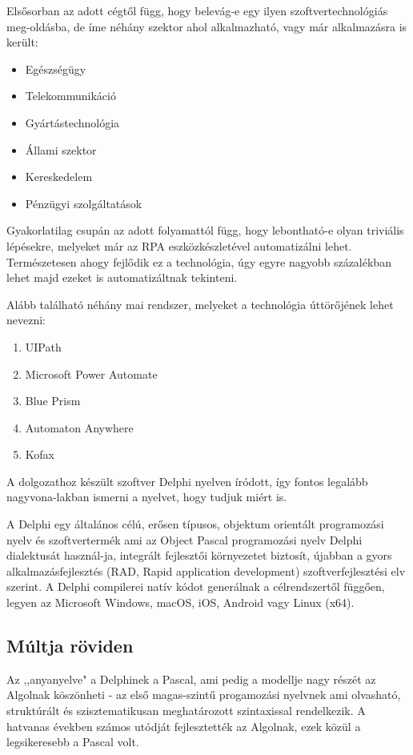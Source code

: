 Elsősorban az adott cégtől függ, hogy belevág-e egy ilyen szoftvertechnológiás meg\hyp{}oldásba, de íme néhány szektor ahol alkalmazható, vagy már alkalmazásra is került:
\begin{itemize}
	\item Egészségügy
	\item Telekommunikáció
	\item Gyártástechnológia
	\item Állami szektor
	\item Kereskedelem
	\item Pénzügyi szolgáltatások
\end{itemize}

Gyakorlatilag csupán az adott folyamattól függ, hogy lebontható-e olyan triviális lépésekre, melyeket már az RPA eszközkészletével automatizálni lehet. Természetesen ahogy fejlődik ez a technológia, úgy egyre nagyobb százalékban lehet majd ezeket is automatizáltnak tekinteni.

Alább található néhány mai rendszer, melyeket a technológia úttörőjének lehet nevezni:
\begin{enumerate}
	\item UIPath
	\item Microsoft Power Automate
	\item Blue Prism
	\item Automaton Anywhere
	\item Kofax
\end{enumerate}


A dolgozathoz készült szoftver Delphi nyelven íródott, így fontos legalább nagyvona\hyp{}lakban ismerni a nyelvet, hogy tudjuk miért is.

A Delphi egy általános célú, erősen típusos, objektum orientált programozási nyelv és szoftvertermék ami az Object Pascal programozási nyelv Delphi dialektusát használ\hyp{}ja, integrált fejlesztői környezetet biztosít, újabban a gyors alkalmazásfejlesztés (RAD, Rapid application development) szoftverfejlesztési elv szerint. A Delphi compilerei natív kódot generálnak a célrendszertől függően, legyen az Microsoft Windows, macOS, iOS, Android vagy Linux (x64).

\textit{\cite{delphi:001}}

\subsection{Múltja röviden}
Az ,,anyanyelve" a Delphinek a Pascal, ami pedig a modellje nagy részét az Algolnak köszönheti - az első magas-szintű progamozási nyelvnek ami olvasható, struktúrált és szisztematikusan meghatározott szintaxissal rendelkezik. A hatvanas években számos utódját fejlesztették az Algolnak, ezek közül a legsikeresebb a Pascal volt.

